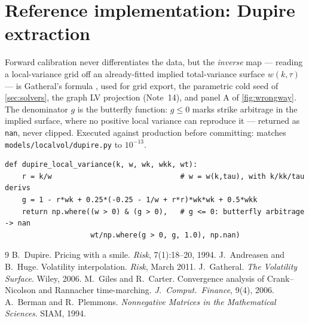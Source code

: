 \documentclass[11pt]{article}
\begin{document}
\section{Reference implementation: Dupire extraction}
\label{app:ref}

Forward calibration never differentiates the data, but the \emph{inverse}
map --- reading a local-variance grid off an already-fitted implied
total-variance surface $w(k,\tau)$ --- is Gatheral's formula
\cite{Gatheral2006}, used for grid export, the parametric cold seed of
\cref{sec:solvers}, the graph LV projection (Note~14), and panel A of
\cref{fig:wrongway}.  The denominator $g$ is the butterfly function:
$g\le0$ marks strike arbitrage in the implied surface, where no positive
local variance can reproduce it --- returned as \texttt{nan}, never
clipped.  Executed against production before committing: matches
\texttt{models/localvol/dupire.py} to $10^{-13}$.

\begin{lstlisting}[caption={Dupire/Gatheral local variance from an implied
total-variance surface (distilled from
\texttt{models/localvol/dupire.py}).}]
def dupire_local_variance(k, w, wk, wkk, wt):
    r = k/w                              # w = w(k,tau), with k/kk/tau derivs
    g = 1 - r*wk + 0.25*(-0.25 - 1/w + r*r)*wk*wk + 0.5*wkk
    return np.where((w > 0) & (g > 0),   # g <= 0: butterfly arbitrage -> nan
                    wt/np.where(g > 0, g, 1.0), np.nan)
\end{lstlisting}

\begin{thebibliography}{9}
 B.~Dupire.  Pricing with a smile.  \emph{Risk},
7(1):18--20, 1994.
 J.~Andreasen and B.~Huge.  Volatility
interpolation.  \emph{Risk}, March 2011.
 J.~Gatheral.  \emph{The Volatility Surface}.
Wiley, 2006.
 M.~Giles and R.~Carter.  Convergence analysis of
Crank--Nicolson and Rannacher time-marching.  \emph{J.\ Comput.\ Finance},
9(4), 2006.
 A.~Berman and R.~Plemmons.  \emph{Nonnegative
Matrices in the Mathematical Sciences}.  SIAM, 1994.
\end{thebibliography}
\end{document}
